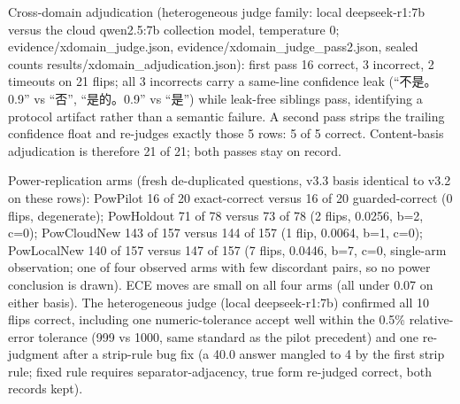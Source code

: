 \documentclass[10pt]{article} %
\begin{document}
Cross-domain adjudication (heterogeneous judge family: local deepseek-r1:7b versus the cloud qwen2.5:7b collection model, temperature 0; evidence/xdomain\_judge.json, evidence/xdomain\_judge\_pass2.json, sealed counts results/xdomain\_adjudication.json): first pass 16 correct, 3 incorrect, 2 timeouts on 21 flips; all 3 incorrects carry a same-line confidence leak (``不是。0.9'' vs ``否'', ``是的。0.9'' vs ``是'') while leak-free siblings pass, identifying a protocol artifact rather than a semantic failure. A second pass strips the trailing confidence float and re-judges exactly those 5 rows: 5 of 5 correct. Content-basis adjudication is therefore 21 of 21; both passes stay on record.

Power-replication arms (fresh de-duplicated questions, v3.3 basis identical to v3.2 on these rows): PowPilot 16 of 20 exact-correct versus 16 of 20 guarded-correct (0 flips, degenerate); PowHoldout 71 of 78 versus 73 of 78 (2 flips, 0.0256, b=2, c=0); PowCloudNew 143 of 157 versus 144 of 157 (1 flip, 0.0064, b=1, c=0); PowLocalNew 140 of 157 versus 147 of 157 (7 flips, 0.0446, b=7, c=0, single-arm observation; one of four observed arms with few discordant pairs, so no power conclusion is drawn). ECE moves are small on all four arms (all under 0.07 on either basis). The heterogeneous judge (local deepseek-r1:7b) confirmed all 10 flips correct, including one numeric-tolerance accept well within the 0.5\% relative-error tolerance (999 vs 1000, same standard as the pilot precedent) and one re-judgment after a strip-rule bug fix (a 40.0 answer mangled to 4 by the first strip rule; fixed rule requires separator-adjacency, true form re-judged correct, both records kept).
\end{document}
